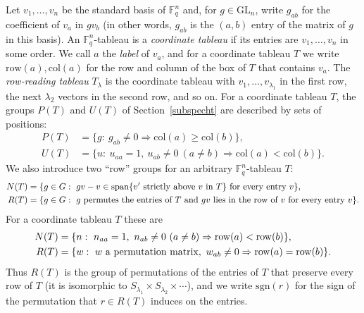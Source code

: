 \documentclass[11pt, letterpaper]{amsart}
\let\amstext\text
\renewcommand{\text}[1]{\amstext{\upshape #1}}%
\theoremstyle{definition}
\theoremstyle{remark}
\newcommand{\FF}{\mathbb{F}}
\newcommand{\GL}{\mathrm{GL}}
\newcommand{\sgn}{\mathrm{sgn}}
\newcommand{\row}{\mathrm{row}}
\newcommand{\col}{\mathrm{col}}
\begin{document}
Let $v_1,\dots,v_n$ be the standard basis of $\FF_q^n$ and, for $g\in\GL_n$, write $g_{ab}$ for the coefficient of $v_a$ in $gv_b$ (in other words, $g_{ab}$ is the $(a,b)$ entry of the matrix of $g$ in this basis). An $\FF_q^n$-tableau is a \emph{coordinate tableau} if its entries are $v_1,\dots,v_n$ in some order. We call $a$ the \emph{label} of $v_a$, and for a coordinate tableau $T$ we write $\row(a),\col(a)$ for the row and column of the box of $T$ that contains $v_a$. The \emph{row-reading tableau} $T_\lambda$ is the coordinate tableau with $v_1,\dots,v_{\lambda_1}$ in the first row, the next $\lambda_2$ vectors in the second row, and so on. For a coordinate tableau $T$, the groups $P(T)$ and $U(T)$ of Section~\ref{subspecht} are described by sets of positions:
\begin{align*}
P(T)&=\{g:\ g_{ab}\ne0\Rightarrow\col(a)\ge\col(b)\},\\
U(T)&=\{u:\ u_{aa}=1,\ u_{ab}\ne0\ (a\ne b)\Rightarrow\col(a)<\col(b)\}.
\end{align*}
We also introduce two ``row'' groups for an arbitrary $\FF_q^n$-tableau $T$:
\begin{align*}
N(T)&=\{g\in G:\ gv-v\in\mathrm{span}\{v'\ \text{strictly above}\ v\ \text{in}\ T\}\ \text{for every entry}\ v\},\\
R(T)&=\{g\in G:\ g\ \text{permutes the entries of}\ T\ \text{and}\ gv\ \text{lies in the row of}\ v\ \text{for every entry}\ v\}.
\end{align*}
For a coordinate tableau $T$ these are
\begin{align*}
N(T)&=\{n:\ n_{aa}=1,\ n_{ab}\ne0\ (a\neq b)\Rightarrow\row(a)<\row(b)\},\\
R(T)&=\{w:\ w\ \text{a permutation matrix},\ w_{ab}\ne0\Rightarrow\row(a)=\row(b)\}.
\end{align*}
Thus $R(T)$ is the group of permutations of the entries of $T$ that preserve every row of $T$ (it is isomorphic to $S_{\lambda_1}\times S_{\lambda_2}\times\cdots$), and we write $\sgn(r)$ for the sign of the permutation that $r\in R(T)$ induces on the entries.
\end{document}
